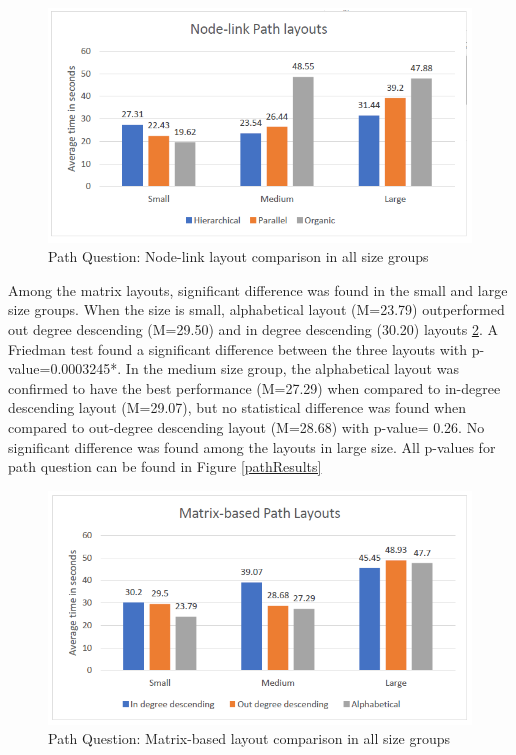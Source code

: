 \documentclass{l4proj}
\begin{document}
\begin{figure}[H]
\centering
\includegraphics[width=13cm]{images/nodePathLayouts.PNG}
\caption{Path Question: Node-link layout comparison in all size groups}
\label{nodePathLayouts}
\end{figure}

Among the matrix layouts, significant difference was found in the small and large size groups. When the size is small, alphabetical layout (M=23.79) outperformed out degree descending (M=29.50) and in degree descending (30.20) layouts \ref{matrixpathlayouts}. A Friedman test found a significant difference between the three layouts with p-value=0.0003245*. In the medium size group, the alphabetical layout was confirmed to have the best performance (M=27.29) when compared to in-degree descending layout (M=29.07), but no statistical difference was found when compared to out-degree descending layout (M=28.68) with p-value= 0.26. No significant difference was found among the layouts in large size. All p-values for path question can be found in Figure \ref{pathResults} 


\begin{figure}[H]
\centering
\includegraphics[width=13cm]{images/matrixpathlayouts.PNG}
\caption{Path Question: Matrix-based layout comparison in all size groups}
\label{matrixpathlayouts}
\end{figure}
\end{document}
